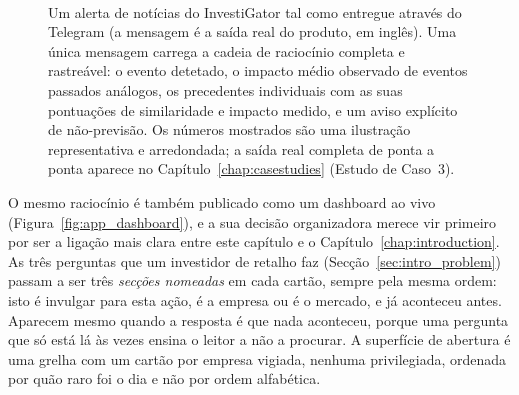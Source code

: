 \begin{figure}[ht]
\centering
\footnotesize
\setlength{\fboxsep}{6pt}%
\colorbox{black!4}{%
  \begin{minipage}{9.2cm}
    \colorbox{black!15}{}\\[5pt]
  \end{minipage}}
\normalsize
\caption[Alerta Telegram tal como recebido pelo investidor]{Um alerta de notícias do InvestiGator tal como
entregue através do Telegram (a mensagem é a saída real do produto, em inglês). Uma única mensagem carrega a
cadeia de raciocínio completa e rastreável: o evento detetado, o impacto médio observado de eventos passados
análogos, os precedentes individuais com as suas pontuações de similaridade e impacto medido, e um aviso
explícito de não-previsão. Os números mostrados são uma ilustração representativa e arredondada; a saída
real completa de ponta a ponta aparece no Capítulo~\ref{chap:casestudies} (Estudo de Caso~3).}
\label{fig:telegram_mockup}
\end{figure}

O mesmo raciocínio é também publicado como um dashboard ao vivo (Figura~\ref{fig:app_dashboard}), e a sua
decisão organizadora merece vir primeiro por ser a ligação mais clara entre este capítulo e o
Capítulo~\ref{chap:introduction}. As três perguntas que um investidor de retalho faz
(Secção~\ref{sec:intro_problem}) passam a ser três \emph{secções nomeadas} em cada cartão, sempre pela
mesma ordem: isto é invulgar para esta ação, é a empresa ou é o mercado, e já aconteceu antes. Aparecem
mesmo quando a resposta é que nada aconteceu, porque uma pergunta que só está lá às vezes ensina o leitor
a não a procurar. A superfície de abertura é uma grelha com um cartão por empresa vigiada, nenhuma
privilegiada, ordenada por quão raro foi o dia e não por ordem alfabética.


